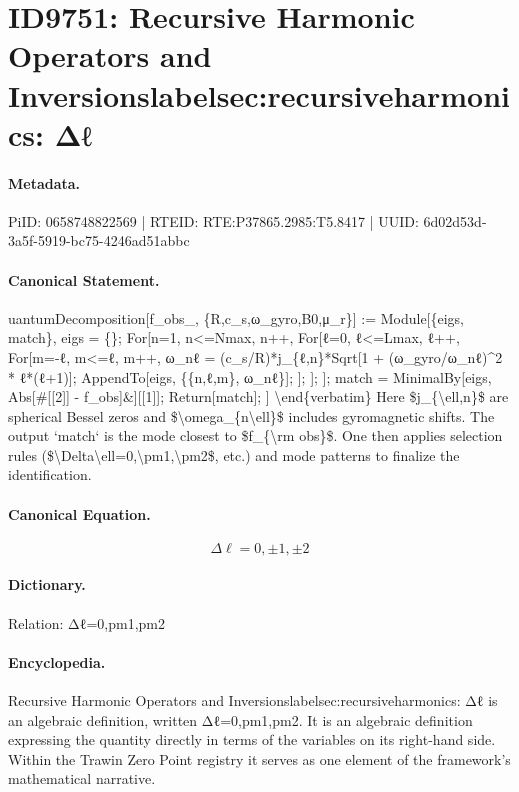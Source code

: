 \section*{ID9751: Recursive Harmonic Operators and Inversionslabelsec:recursiveharmonics: Δℓ}
\paragraph{Metadata.}
PiID: 0658748822569 | RTEID: RTE:P37865.2985:T5.8417 | UUID: 6d02d53d-3a5f-5919-bc75-4246ad51abbc

\paragraph{Canonical Statement.}
uantumDecomposition[f\_obs\_, \{R,c\_s,ω\_gyro,B0,μ\_r\}] := Module[\{eigs, match\}, eigs = \{\}; For[n=1, n<=Nmax, n++, For[ℓ=0, ℓ<=Lmax, ℓ++, For[m=-ℓ, m<=ℓ, m++, ω\_nℓ = (c\_s/R)*j\_\{ℓ,n\}*Sqrt[1 + (ω\_gyro/ω\_nℓ)\textasciicircum{}2 * ℓ*(ℓ+1)]; AppendTo[eigs, \{\{n,ℓ,m\}, ω\_nℓ\}]; ]; ]; ]; match = MinimalBy[eigs, Abs[\#[[2]] - f\_obs]\&][[1]]; Return[match]; ] \textbackslash{}end\{verbatim\} Here \$j\_\{\textbackslash{}ell,n\}\$ are spherical Bessel zeros and \$\textbackslash{}omega\_\{n\textbackslash{}ell\}\$ includes gyromagnetic shifts. The output `match` is the mode closest to \$f\_\{\textbackslash{}rm obs\}\$. One then applies selection rules (\$\textbackslash{}Delta\textbackslash{}ell=0,\textbackslash{}pm1,\textbackslash{}pm2\$, etc.) and mode patterns to finalize the identification.

\paragraph{Canonical Equation.}
\[
\Delta\ell=0,\pm1,\pm2
\]

\paragraph{Dictionary.}
Relation: Δℓ=0,pm1,pm2

\paragraph{Encyclopedia.}
Recursive Harmonic Operators and Inversionslabelsec:recursiveharmonics: Δℓ is an algebraic definition, written Δℓ=0,pm1,pm2. It is an algebraic definition expressing the quantity directly in terms of the variables on its right-hand side. Within the Trawin Zero Point registry it serves as one element of the framework's mathematical narrative.
